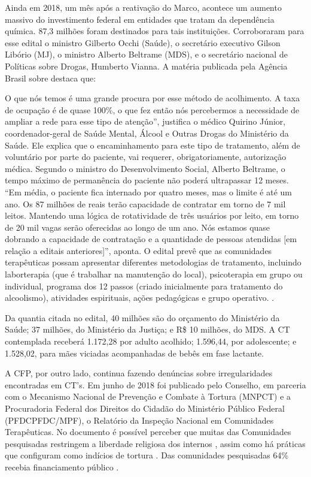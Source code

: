 \documentclass[
	12pt,				%
	oneside,			%
	a4paper,			%
	sumario=tradicional,
	english,			%
	brazil				%
	]{abntex2}
\begin{document}
Ainda em 2018, um mês após a reativação do Marco, acontece um aumento massivo do investimento federal em entidades que tratam da dependência química. 87,3 milhões foram destinados para tais instituições. Corroboraram para esse edital o ministro Gilberto Occhi (Saúde), o secretário executivo Gilson Libório (\acrshort{MJ}), o ministro Alberto Beltrame (\acrshort{MDS}), e o secretário nacional de Políticas sobre Drogas, Humberto Vianna. A matéria publicada pela Agência Brasil sobre destaca que:
\begin{quoting}[rightmargin=0cm,leftmargin=4cm]
\begin{singlespace}
{\footnotesize
O que nós temos é uma grande procura por esse método de acolhimento. A taxa de ocupação é de quase 100\%, o que fez então nós percebermos a necessidade de ampliar a rede para esse tipo de atenção”, justifica o médico Quirino Júnior, coordenador-geral de Saúde Mental, Álcool e Outras Drogas do Ministério da Saúde. Ele explica que o encaminhamento para este tipo de tratamento, além de voluntário por parte do paciente, vai requerer, obrigatoriamente, autorização médica. Segundo o ministro do Desenvolvimento Social, Alberto Beltrame, o tempo máximo de permanência do paciente não poderá ultrapassar 12 meses. “Em média, o paciente fica internado por quatro meses, mas o limite é até um ano. Os 87 milhões de reais terão capacidade de contratar em torno de 7 mil leitos. Mantendo uma lógica de rotatividade de três usuários por leito, em torno de 20 mil vagas serão oferecidas ao longo de um ano. Nós estamos quase dobrando a capacidade de contratação e a quantidade de pessoas atendidas [em relação a editais anteriores]”, aponta. O edital prevê que as comunidades terapêuticas possam apresentar diferentes metodologias de tratamento, incluindo laborterapia (que é trabalhar na manutenção do local), psicoterapia em grupo ou individual, programa dos 12 passos (criado inicialmente para tratamento do alcoolismo), atividades espirituais, ações pedagógicas e grupo operativo. \cite{agencia2018}.}
\end{singlespace}
\end{quoting}
Da quantia citada no edital, 40 milhões são do orçamento do Ministério da Saúde; 37 milhões, do Ministério da Justiça; e R\$ 10 milhões, do MDS. A CT contemplada receberá 1.172,28 por adulto acolhido; 1.596,44, por adolescente; e 1.528,02, para mães viciadas acompanhadas de bebês em fase lactante.

A CFP, por outro lado, continua fazendo denúncias sobre irregularidades encontradas em CT's. Em junho de 2018 foi publicado pelo Conselho, em parceria com o Mecanismo Nacional de Prevenção e Combate à Tortura (\acrshort{MNPCT}) e a Procuradoria Federal dos Direitos do Cidadão do Ministério Público Federal (\acrshort{PFDC}PFDC/MPF), o Relatório da Inspeção Nacional em Comunidades Terapêuticas. No documento é possível perceber que muitas das Comunidades pesquisadas restringem a liberdade religiosa dos internos \autocite[15]{cfp2018}, assim como há práticas que configuram como indícios de tortura \autocite[14]{cfp2018}. Das comunidades pesquisadas 64\% recebia financiamento público \autocite[18]{cfp2018}.
\end{document}
